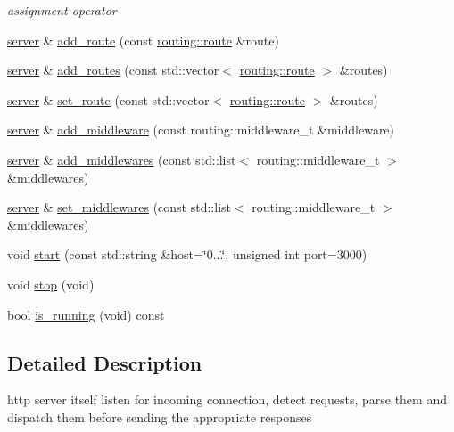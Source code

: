 \begin{DoxyCompactItemize}
\begin{DoxyCompactList}\small\item\em assignment operator \end{DoxyCompactList}\item 
\hyperlink{classnetflex_1_1http_1_1server}{server} \& \hyperlink{classnetflex_1_1http_1_1server_a704f899f913b798d217bf75309043add}{add\+\_\+route} (const \hyperlink{classnetflex_1_1routing_1_1route}{routing\+::route} \&route)
\item 
\hyperlink{classnetflex_1_1http_1_1server}{server} \& \hyperlink{classnetflex_1_1http_1_1server_a1363b27c4d5752706239407dc961d8d5}{add\+\_\+routes} (const std\+::vector$<$ \hyperlink{classnetflex_1_1routing_1_1route}{routing\+::route} $>$ \&routes)
\item 
\hyperlink{classnetflex_1_1http_1_1server}{server} \& \hyperlink{classnetflex_1_1http_1_1server_ac55de13a22c11bbf5a93c5e105e2bf0b}{set\+\_\+route} (const std\+::vector$<$ \hyperlink{classnetflex_1_1routing_1_1route}{routing\+::route} $>$ \&routes)
\item 
\hyperlink{classnetflex_1_1http_1_1server}{server} \& \hyperlink{classnetflex_1_1http_1_1server_a636cba8b31debed0d880db5905736450}{add\+\_\+middleware} (const routing\+::middleware\+\_\+t \&middleware)
\item 
\hyperlink{classnetflex_1_1http_1_1server}{server} \& \hyperlink{classnetflex_1_1http_1_1server_a266ef122b1fd38062a5b45ef58f15b2a}{add\+\_\+middlewares} (const std\+::list$<$ routing\+::middleware\+\_\+t $>$ \&middlewares)
\item 
\hyperlink{classnetflex_1_1http_1_1server}{server} \& \hyperlink{classnetflex_1_1http_1_1server_a1f7b8f1cfb800f68d9ca4cfa1ed3aa08}{set\+\_\+middlewares} (const std\+::list$<$ routing\+::middleware\+\_\+t $>$ \&middlewares)
\item 
void \hyperlink{classnetflex_1_1http_1_1server_a2eb01cb96d5ebe6c9ddc25eea32b14d0}{start} (const std\+::string \&host=\char`\"{}0...\char`\"{}, unsigned int port=3000)
\item 
void \hyperlink{classnetflex_1_1http_1_1server_aee4736188137a75879e972d325b2c460}{stop} (void)
\item 
bool \hyperlink{classnetflex_1_1http_1_1server_a0b901ac09d2aa5a1597197c756307609}{is\+\_\+running} (void) const
\end{DoxyCompactItemize}


\subsection{Detailed Description}
http server itself listen for incoming connection, detect requests, parse them and dispatch them before sending the appropriate responses 


